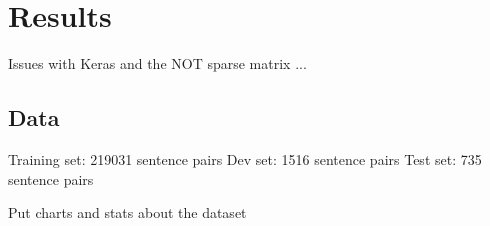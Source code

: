 
\chapter{Results} %

\label{Chapter4} %

Issues with Keras and the NOT sparse matrix ...


\section{Data}
Training set: 219031 sentence pairs
Dev set: 1516 sentence pairs
Test set: 735 sentence pairs

Put charts and stats about the dataset
